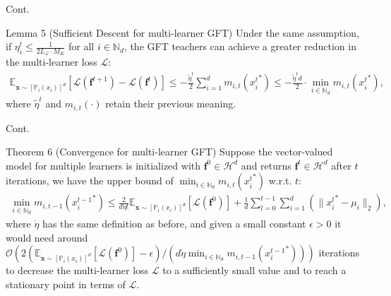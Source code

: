 \documentclass[aspectratio=169,xcolor=dvipsnames]{beamer}
\begin{document}
\begin{frame}{Cont.}
\begin{block}{Lemma 5 (Sufficient Descent for multi-learner GFT)} Under the same assumption, if $\eta^t_i\leq \frac{1}{2L_\mathcal{L}\cdot M_K}$ for all $i\in\mathbb{N}_d$, the GFT teachers can achieve a \alert{greater} reduction in the multi-learner loss $\mathcal{L}$:
	\begin{eqnarray}
		\mathbb{E}_{\bm{x}\sim[\mathbb{P}_i(x_i)]^d}\left[\mathcal{L}(\bm{f}^{t+1})-\mathcal{L}(\bm{f}^t)\right]\leq-\frac{\tilde{\eta}^t}{2}\sum_{i=1}^d m_{i,t}({x^t_i}^*)\leq-\frac{\tilde{\eta}^t d}{2}\cdot\min_{i\in\mathbb{N}_d} m_{i,t}({x^t_i}^*),
	\end{eqnarray}
	where $\tilde{\eta}^t$ and $m_{i,t}(\cdot)$ retain their previous meaning.
\end{block} 
\end{frame}

\begin{frame}{Cont.}
\begin{block}{Theorem 6 (Convergence for multi-learner GFT)} Suppose the \alert{vector-valued} model for multiple learners is initialized with $\bm{f}^0\in\mathcal{H}^d$ and returns $\bm{f}^t\in\mathcal{H}^d$ after $t$ iterations, we have the \alert{upper bound} of $\min_{i\in\mathbb{N}_d} m_{i,t}({x^t_i}^*)$ w.r.t. $t$:
	\begin{eqnarray}\label{eqcgft}
		\min_{i\in\mathbb{N}_d} m_{i,t-1}({x^{t-1}_i}^*)\leq\frac{2}{d\dot{\eta}t}\mathbb{E}_{\bm{x}\sim[\mathbb{P}_i(x_i)]^d}\left[\mathcal{L}(\bm{f}^0)\right]+\frac{1}{d}\sum_{l=0}^{t-1}\sum_{i=1}^d \left(\|{x^l_i}^*-\mu_i\|_2\right),
	\end{eqnarray}
	where $\dot{\eta}$ has the same definition as before, and given a small constant $\epsilon>0$ it would need around $\mathcal{O}\left(2(\mathbb{E}_{\bm{x}\sim[\mathbb{P}_i(x_i)]^d}\left[\mathcal{L}(\bm{f}^0)\right]-\epsilon)/(d\dot{\eta}\min_{i\in\mathbb{N}_d} m_{i,t-1}({x^{t-1}_i}^*))\right)$ iterations to decrease the \alert{multi-learner} loss $\mathcal{L}$ to a \alert{sufficiently small} value and to reach a \alert{stationary point} in terms of $\mathcal{L}$.
\end{block} 
\end{frame}
\end{document}
